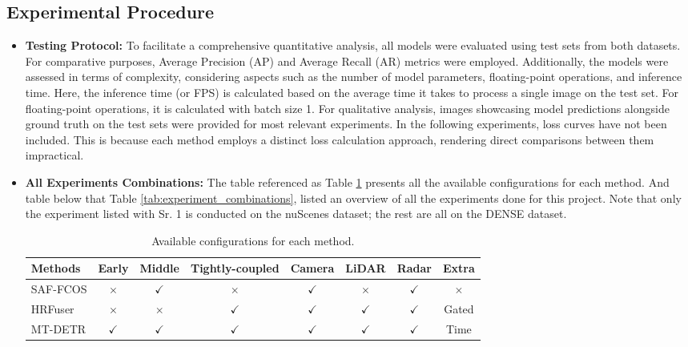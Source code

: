 \documentclass[report.tex]{subfiles}
\begin{document}
        

        
        \subsection{Experimental Procedure}
        \begin{itemize}
            \item \textbf{Testing Protocol:} To facilitate a comprehensive quantitative analysis, all models were evaluated using test sets from both datasets. For comparative purposes, Average Precision (AP) and Average Recall (AR) metrics were employed. Additionally, the models were assessed in terms of complexity, considering aspects such as the number of model parameters, floating-point operations, and inference time. Here, the inference time (or FPS) is calculated based on the average time it takes to process a single image on the test set. For floating-point operations, it is calculated with batch size 1. For qualitative analysis, images showcasing model predictions alongside ground truth on the test sets were provided for most relevant experiments. In the following experiments, loss curves have not been included. This is because each method employs a distinct loss calculation approach, rendering direct comparisons between them impractical.
            \item \textbf{All Experiments Combinations:} The table referenced as Table \ref{tab:total_available_configurations} presents all the available configurations for each method. And table below that Table \ref{tab:experiment_combinations}, listed an overview of all the experiments done for this project. Note that only the experiment listed with Sr. 1 is conducted on the nuScenes dataset; the rest are all on the DENSE dataset.

            \begin{table}[h!]
                \centering
                \caption{Available configurations for each method.}
                \begin{tabular}{|l|c|c|c|c|c|c|c|}
                \hline
                \textbf{Methods} & \textbf{Early} & \textbf{Middle} & \textbf{Tightly-coupled} & \textbf{Camera} & \textbf{LiDAR} & \textbf{Radar} & \textbf{Extra} \\ \hline
                SAF-FCOS & $\times$ & $\checkmark$ & $\times$ & $\checkmark$ & $\times$ & $\checkmark$ & $\times$ \\ \hline
                HRFuser & $\times$ & $\times$ & $\checkmark$ & $\checkmark$ & $\checkmark$ & $\checkmark$ & Gated \\ \hline
                MT-DETR & $\checkmark$ & $\checkmark$ & $\checkmark$ & $\checkmark$ & $\checkmark$ & $\checkmark$ & Time \\ \hline
                \end{tabular}
                \label{tab:total_available_configurations}
            \end{table}
            


\end{itemize}
\end{document}
